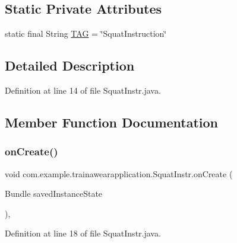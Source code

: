 \subsection*{Static Private Attributes}
\begin{DoxyCompactItemize}
\item 
static final String \mbox{\hyperlink{classcom_1_1example_1_1trainawearapplication_1_1_squat_instr_ad7fe74204afe9fb8319e762c400a9d9d}{T\+AG}} = \char`\"{}Squat\+Instruction\char`\"{}
\end{DoxyCompactItemize}


\subsection{Detailed Description}


Definition at line 14 of file Squat\+Instr.\+java.



\subsection{Member Function Documentation}
\mbox{\label{classcom_1_1example_1_1trainawearapplication_1_1_squat_instr_a7e7f753fc9bfbdc0dc8b8db20a59713e}} 
\subsubsection{\texorpdfstring{onCreate()}{onCreate()}}
{\footnotesize\ttfamily void com.\+example.\+trainawearapplication.\+Squat\+Instr.\+on\+Create (\begin{DoxyParamCaption}\item[{Bundle}]{saved\+Instance\+State }\end{DoxyParamCaption})\hspace{0.3cm}{\ttfamily [inline]}, {\ttfamily [protected]}}



Definition at line 18 of file Squat\+Instr.\+java.


\begin{DoxyCode}{0}

\end{DoxyCode}



